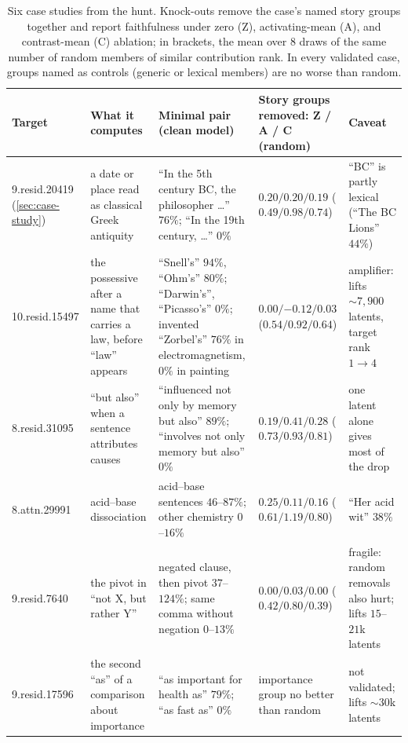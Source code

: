 \documentclass[10pt]{article}
\begin{document}
\begin{table}[t]
\centering
\small
\setlength{\tabcolsep}{4pt}
\begin{tabular}{p{2.0cm}p{2.7cm}p{3.0cm}p{2.5cm}p{2.3cm}}
\toprule
\textbf{Target} & \textbf{What it computes} & \textbf{Minimal pair (clean model)} & \textbf{Story groups removed: Z / A / C (random)} & \textbf{Caveat} \\
\midrule
9.resid.20419 (\cref{sec:case-study}) & a date or place read as classical Greek antiquity & ``In the 5th century BC, the philosopher \ldots'' $76\%$; ``In the 19th century, \ldots'' $0\%$ & $0.20 / 0.20 / 0.19$ \newline ($0.49 / 0.98 / 0.74$) & ``BC'' is partly lexical (``The BC Lions'' $44\%$) \\
10.resid.15497 & the possessive after a name that carries a law, before ``law'' appears & ``Snell's'' $94\%$, ``Ohm's'' $80\%$; ``Darwin's'', ``Picasso's'' $0\%$; invented ``Zorbel's'' $76\%$ in electromagnetism, $0\%$ in painting & $0.00 / {-0.12} / 0.03$ \newline ($0.54 / 0.92 / 0.64$) & amplifier: lifts ${\sim}7{,}900$ latents, target rank $1 \to 4$ \\
8.resid.31095 & ``but also'' when a sentence attributes causes & ``influenced not only by memory but also'' $89\%$; ``involves not only memory but also'' $0\%$ & $0.19 / 0.41 / 0.28$ \newline ($0.73 / 0.93 / 0.81$) & one latent alone gives most of the drop \\
8.attn.29991 & acid--base dissociation & acid--base sentences $46$--$87\%$; other chemistry $0$--$16\%$ & $0.25 / 0.11 / 0.16$ \newline ($0.61 / 1.19 / 0.80$) & ``Her acid wit'' $38\%$ \\
9.resid.7640 & the pivot in ``not X, but rather Y'' & negated clause, then pivot $37$--$124\%$; same comma without negation $0$--$13\%$ & $0.00 / 0.03 / 0.00$ \newline ($0.42 / 0.80 / 0.39$) & fragile: random removals also hurt; lifts $15$--$21$k latents \\
9.resid.17596 & the second ``as'' of a comparison about importance & ``as important for health as'' $79\%$; ``as fast as'' $0\%$ & importance group no better than random & not validated; lifts ${\sim}30$k latents \\
\bottomrule
\end{tabular}
\caption{Six case studies from the hunt.
Knock-outs remove the case's named story groups together and report faithfulness under zero (Z), activating-mean (A), and contrast-mean (C) ablation; in brackets, the mean over $8$ draws of the same number of random members of similar contribution rank.
In every validated case, groups named as controls (generic or lexical members) are no worse than random.}
\label{tab:case-studies}
\end{table}
\end{document}
